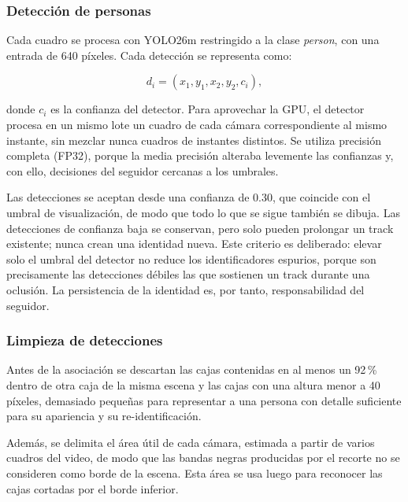 \documentclass[12pt,letterpaper]{article}
\begin{document}
\subsubsection{Detección de personas}

Cada cuadro se procesa con YOLO26m restringido a la clase
\textit{person}, con una entrada de 640 píxeles. Cada detección se
representa como:

\begin{equation}
d_i = (x_1,y_1,x_2,y_2,c_i),
\end{equation}

donde $c_i$ es la confianza del detector. Para aprovechar la GPU, el
detector procesa en un mismo lote un cuadro de cada cámara
correspondiente al mismo instante, sin mezclar nunca cuadros de instantes
distintos. Se utiliza precisión completa (FP32), porque la media
precisión alteraba levemente las confianzas y, con ello, decisiones del
seguidor cercanas a los umbrales.

Las detecciones se aceptan desde una confianza de 0.30, que coincide con
el umbral de visualización, de modo que todo lo que se sigue también se
dibuja. Las detecciones de confianza baja se conservan, pero solo pueden
prolongar un track existente; nunca crean una identidad nueva. Este
criterio es deliberado: elevar solo el umbral del detector no reduce los
identificadores espurios, porque son precisamente las detecciones débiles
las que sostienen un track durante una oclusión. La persistencia de la
identidad es, por tanto, responsabilidad del seguidor.

\subsubsection{Limpieza de detecciones}

Antes de la asociación se descartan las cajas contenidas en al menos un
92\,\% dentro de otra caja de la misma escena y las cajas con una altura
menor a 40 píxeles, demasiado pequeñas para representar a una persona
con detalle suficiente para su apariencia y su re-identificación.

Además, se delimita el área útil de cada cámara, estimada a partir de
varios cuadros del video, de modo que las bandas negras producidas por
el recorte no se consideren como borde de la escena. Esta área se usa
luego para reconocer las cajas cortadas por el borde inferior.
\end{document}
